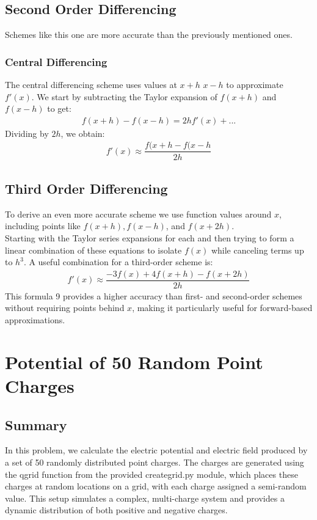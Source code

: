 \documentclass{article}
\begin{document}
\subsection{Second Order Differencing}
Schemes like this one are more accurate than the previously mentioned ones.
\subsubsection{Central Differencing}
The central differencing scheme uses values at $x+h$  $x-h$ to approximate $f'(x)$. We start by subtracting the Taylor expansion of $f(x+h)$ and $f(x-h)$ to get: 
\begin{align}
 f(x+h)-f(x-h)=2hf'(x)+...
\end{align}
Dividing by $2h$, we obtain: 
\begin{align}
 f'(x)\approx\dfrac{f(x+h-f(x-h}{2h}
\end{align}
\subsection{Third Order Differencing}
To derive an even more accurate scheme we use function values around $x$, including points like $f(x+h),f(x-h)$, and $f(x+2h)$. 
\\Starting with the Taylor series expansions for each and then trying to form a linear combination of these equations to isolate $f(x)$ while canceling terms up to $h^3$. A useful combination for a third-order scheme is: 
\begin{align}
 f'(x)\approx\dfrac{-3f(x)+4f(x+h)-f(x+2h)}{2h}
\end{align}
This formula 9  provides a higher accuracy than first- and second-order schemes without requiring points behind $x$, making it particularly useful for forward-based approximations.
\section{Potential of 50 Random Point Charges}
\subsection{Summary}
In this problem, we calculate the electric potential and electric field produced by a set of 50 randomly distributed point charges. The charges are generated using the qgrid function from the provided creategrid.py module, which places these charges at random locations on a grid, with each charge assigned a semi-random value. This setup simulates a complex, multi-charge system and provides a dynamic distribution of both positive and negative charges.
\end{document}

